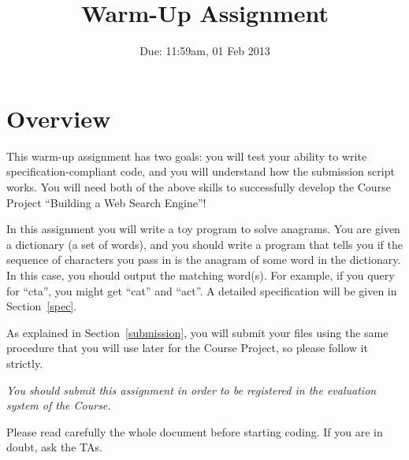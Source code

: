 \documentclass[10pt]{article}
\begin{document}
\title{\vspace{-15mm}{\small Brown~University --- CSCI~1580 --- Spring~2013}\\Warm-Up Assignment}
\author{Due: 11:59am, 01 Feb 2013}
\date{}
\maketitle
\pagestyle{plain}
\thispagestyle{empty}

\section*{Overview}


This warm-up assignment has two goals:
you will test your ability to write
specification-compliant code,
and you will understand how the submission script works.
You will need both of the above skills
to successfully develop the Course Project
``Building a Web Search Engine''!

In this assignment you will write a toy program
to solve anagrams.
You are given a dictionary (a set of words),
and you should write a program that tells you
if the sequence of characters you pass in
is the anagram of some word in the dictionary.
In this case, you should output the matching word(s).
For example, if you query for ``cta'',
you might get ``cat'' and ``act''.
A detailed specification will be given
in Section~\ref{spec}.

As explained in Section~\ref{submission},
you will submit your files
using the same procedure that
you will use later for the Course Project,
so please follow it strictly.

\emph{You should submit this assignment
in order to be registered
in the evaluation system of the Course.}

Please read carefully the whole document
before starting coding.
If you are in doubt, ask the TAs.
\end{document}
